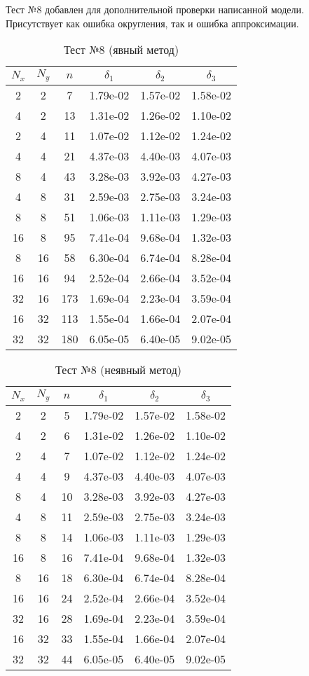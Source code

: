 \newpage
Тест №8 добавлен для дополнительной проверки написанной модели.
Присутствует как ошибка округления, так и ошибка аппроксимации.
\begin{table}[H]
	\centering
	\begin{tabular}{*6c}
		\toprule
		$N_x$ & $N_y$ & $n$ & $\delta_1$ & $\delta_2$ & $\delta_3$ \\
		\midrule
		2 & 2 & 7 & 1.79e-02 & 1.57e-02 & 1.58e-02 \\
		4 & 2 & 13 & 1.31e-02 & 1.26e-02 & 1.10e-02 \\
		2 & 4 & 11 & 1.07e-02 & 1.12e-02 & 1.24e-02 \\
		4 & 4 & 21 & 4.37e-03 & 4.40e-03 & 4.07e-03 \\
		8 & 4 & 43 & 3.28e-03 & 3.92e-03 & 4.27e-03 \\
		4 & 8 & 31 & 2.59e-03 & 2.75e-03 & 3.24e-03 \\
		8 & 8 & 51 & 1.06e-03 & 1.11e-03 & 1.29e-03 \\
		16 & 8 & 95 & 7.41e-04 & 9.68e-04 & 1.32e-03 \\
		8 & 16 & 58 & 6.30e-04 & 6.74e-04 & 8.28e-04 \\
		16 & 16 & 94 & 2.52e-04 & 2.66e-04 & 3.52e-04 \\
		32 & 16 & 173 & 1.69e-04 & 2.23e-04 & 3.59e-04 \\
		16 & 32 & 113 & 1.55e-04 & 1.66e-04 & 2.07e-04 \\
		32 & 32 & 180 & 6.05e-05 & 6.40e-05 & 9.02e-05 \\
		\bottomrule
	\end{tabular}
	\caption{Тест №8 (явный метод)}
\end{table}
\begin{table}[H]
	\centering
	\begin{tabular}{*6c}
		\toprule
		$N_x$ & $N_y$ & $n$ & $\delta_1$ & $\delta_2$ & $\delta_3$ \\
		\midrule
		2 & 2 & 5 & 1.79e-02 & 1.57e-02 & 1.58e-02 \\
		4 & 2 & 6 & 1.31e-02 & 1.26e-02 & 1.10e-02 \\
		2 & 4 & 7 & 1.07e-02 & 1.12e-02 & 1.24e-02 \\
		4 & 4 & 9 & 4.37e-03 & 4.40e-03 & 4.07e-03 \\
		8 & 4 & 10 & 3.28e-03 & 3.92e-03 & 4.27e-03 \\
		4 & 8 & 11 & 2.59e-03 & 2.75e-03 & 3.24e-03 \\
		8 & 8 & 14 & 1.06e-03 & 1.11e-03 & 1.29e-03 \\
		16 & 8 & 16 & 7.41e-04 & 9.68e-04 & 1.32e-03 \\
		8 & 16 & 18 & 6.30e-04 & 6.74e-04 & 8.28e-04 \\
		16 & 16 & 24 & 2.52e-04 & 2.66e-04 & 3.52e-04 \\
		32 & 16 & 28 & 1.69e-04 & 2.23e-04 & 3.59e-04 \\
		16 & 32 & 33 & 1.55e-04 & 1.66e-04 & 2.07e-04 \\
		32 & 32 & 44 & 6.05e-05 & 6.40e-05 & 9.02e-05 \\
		\bottomrule
	\end{tabular}
	\caption{Тест №8 (неявный метод)}
\end{table}

